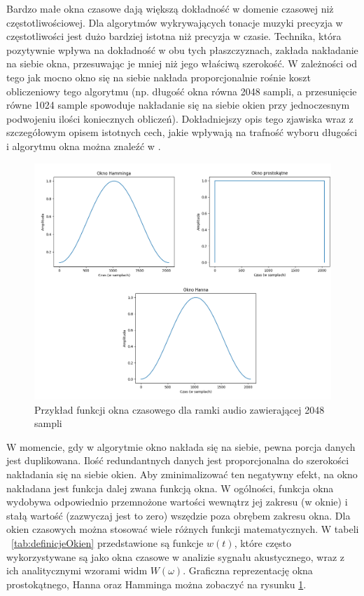 \documentclass[12pt,a4paper,twoside]{mwart}
\begin{document}
Bardzo małe okna czasowe dają większą dokładność w domenie czasowej niż częstotliwościowej. Dla algorytmów wykrywających tonacje muzyki precyzja w częstotliwości jest dużo bardziej istotna niż precyzja w czasie. Technika, która pozytywnie wpływa na dokładność w obu tych płaszczyznach, zakłada nakładanie na siebie okna, przesuwając je mniej niż jego właściwą szerokość. W zależności od tego jak mocno okno się na siebie nakłada proporcjonalnie rośnie koszt obliczeniowy tego algorytmu (np. długość okna równa 2048 sampli, a przesunięcie równe 1024 sample spowoduje nakładanie się na siebie okien przy jednoczesnym podwojeniu ilości koniecznych obliczeń). Dokładniejszy opis tego zjawiska wraz z szczegółowym opisem istotnych cech, jakie wpływają na trafność wyboru długości i algorytmu okna można znaleźć w \cite{WindowChoiceStrategiesSTFT}.


\begin{figure}[t]
  \begin{center}
    \includegraphics[scale=1.4]{images/WindowFunctions.png}
    \caption{Przykład funkcji okna czasowego dla ramki audio zawierającej 2048 sampli}
    \label{fig:WindowFunctions}
  \end{center}
\end{figure}


W momencie, gdy w algorytmie okno nakłada się na siebie, pewna porcja danych jest duplikowana. Ilość redundantnych danych jest proporcjonalna do szerokości nakładania się na siebie okien. Aby zminimalizować ten negatywny efekt, na okno nakładana jest funkcja dalej zwana funkcją okna. W ogólności, funkcja okna wydobywa odpowiednio przemnożone wartości wewnątrz jej zakresu (w oknie) i stałą wartość (zazwyczaj jest to zero) wszędzie poza obrębem zakresu okna. Dla okien czasowych można stosować wiele różnych funkcji matematycznych. W tabeli ~\ref{tab:definicjeOkien} przedstawione są funkcje $w(t)$, które często wykorzystywane są jako okna czasowe w analizie sygnału akustycznego, wraz z ich analitycznymi wzorami widm $W(\omega)$. Graficzna reprezentację okna prostokątnego, Hanna oraz Hamminga można zobaczyć na rysunku \ref{fig:WindowFunctions}\cite[103, 106]{CyfrowePrzetwarzanieSygnalowOdTeoriiDoZastosowan}\cite{Transcription:Kunieda:Aclos}.
\end{document}
